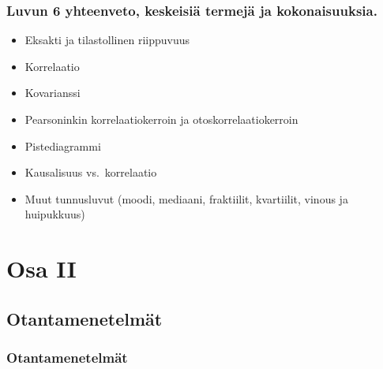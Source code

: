 \documentclass[
]{book}
\providecommand{\tightlist}{%
  \setlength{\itemsep}{0pt}\setlength{\parskip}{0pt}}
\begin{document}
\hypertarget{luvun-6-yhteenveto-keskeisiuxe4-termejuxe4-ja-kokonaisuuksia.}{%
\section{Luvun 6 yhteenveto, keskeisiä termejä ja kokonaisuuksia.}\label{luvun-6-yhteenveto-keskeisiuxe4-termejuxe4-ja-kokonaisuuksia.}}

\begin{itemize}
\tightlist
\item
  Eksakti ja tilastollinen riippuvuus
\item
  Korrelaatio
\item
  Kovarianssi
\item
  Pearsoninkin korrelaatiokerroin ja otoskorrelaatiokerroin
\item
  Pistediagrammi
\item
  Kausalisuus vs.~korrelaatio
\item
  Muut tunnusluvut (moodi, mediaani, fraktiilit, kvartiilit, vinous ja huipukkuus)
\end{itemize}


\hypertarget{part-osa-ii}{%
\part{Osa II}\label{part-osa-ii}}

\hypertarget{luku7}{%
\chapter{Otantamenetelmät}\label{luku7}}

\hypertarget{alaluku71}{%
\section{Otantamenetelmät}\label{alaluku71}}
\end{document}
